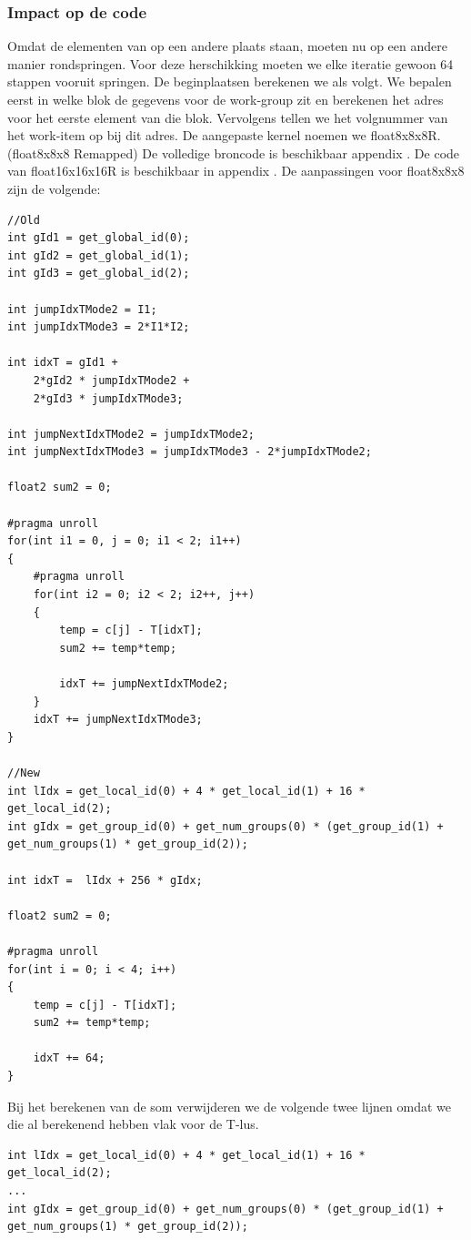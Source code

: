 \subsubsection{Impact op de code}
Omdat de elementen van \TT{} op een andere plaats staan, moeten nu op een andere manier rondspringen. Voor deze herschikking moeten we elke iteratie gewoon 64 stappen vooruit springen. De beginplaatsen berekenen we als volgt. We bepalen eerst in welke blok de gegevens voor de work-group zit en berekenen het adres voor het eerste element van die blok. Vervolgens tellen we het volgnummer van het work-item op bij dit adres. De aangepaste kernel noemen we float8x8x8R. (float8x8x8 Remapped) De volledige broncode is beschikbaar appendix . De code van float16x16x16R is beschikbaar in appendix . De aanpassingen voor float8x8x8 zijn de volgende:
\begin{lstlisting}
//Old
int gId1 = get_global_id(0);
int gId2 = get_global_id(1);
int gId3 = get_global_id(2);

int jumpIdxTMode2 = I1;
int jumpIdxTMode3 = 2*I1*I2;

int idxT = gId1 + 
	2*gId2 * jumpIdxTMode2 +
	2*gId3 * jumpIdxTMode3;

int jumpNextIdxTMode2 = jumpIdxTMode2;
int jumpNextIdxTMode3 = jumpIdxTMode3 - 2*jumpIdxTMode2;

float2 sum2 = 0;

#pragma unroll
for(int i1 = 0, j = 0; i1 < 2; i1++)
{
	#pragma unroll
	for(int i2 = 0; i2 < 2; i2++, j++)
	{
		temp = c[j] - T[idxT];
		sum2 += temp*temp;
		
		idxT += jumpNextIdxTMode2;
	}
	idxT += jumpNextIdxTMode3;
}

//New
int lIdx = get_local_id(0) + 4 * get_local_id(1) + 16 * get_local_id(2);
int gIdx = get_group_id(0) + get_num_groups(0) * (get_group_id(1) + get_num_groups(1) * get_group_id(2));

int idxT =  lIdx + 256 * gIdx;   

float2 sum2 = 0;

#pragma unroll
for(int i = 0; i < 4; i++)
{
	temp = c[j] - T[idxT];
	sum2 += temp*temp;
		
	idxT += 64;
}
\end{lstlisting}
Bij het berekenen van de som verwijderen we de volgende twee lijnen omdat we die al berekenend hebben vlak voor de T-lus.
\begin{lstlisting}
int lIdx = get_local_id(0) + 4 * get_local_id(1) + 16 * get_local_id(2);
...
int gIdx = get_group_id(0) + get_num_groups(0) * (get_group_id(1) + get_num_groups(1) * get_group_id(2));
\end{lstlisting}

